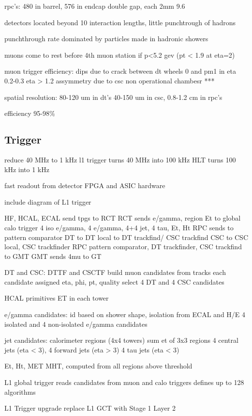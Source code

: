 \documentclass[oneside, letterpaper, oldfontcommands]{memoir}
\begin{document}
rpc's: 480 in barrel, 576 in endcap
double gap, each 2mm 9.6

detectors located beyond 10 interaction lengths, little punchtrough of hadrons

punchthrough rate dominated by particles made in hadronic showers

muons come to rest before 4th muon station if p<5.2 gev (pt < 1.9 at eta=2)

muon trigger efficiency: dips due to crack between dt wheels 0 and pm1 in eta 0.2-0.3
eta > 1.2 assymmetry due to csc non operational chambesr ***

spatial resolution: 80-120 um in dt's 40-150 um in csc, 0.8-1.2 cm in rpc's

efficiency 95-98\%
\subsection{Trigger}\label{trigger}

reduce 40 MHz to 1 kHz
l1 trigger turns 40 MHz into 100 kHz
HLT turns 100 kHz into 1 kHz

fast readout from detector
FPGA and ASIC hardware 

include diagram of L1 trigger

HF, HCAL, ECAL send tpgs to RCT
RCT sends e/gamma, region Et to global calo trigger
4 iso e/gamma, 4 e/gamma, 4+4 jet, 4 tau, Et, Ht
RPC sends to pattern comparator
DT to DT local to DT trackfind/ CSC trackfind
CSC to CSC local, CSC trackfinder
RPC pattern comparator, DT trackfinder, CSC trackfind to GMT
GMT sends 4mu to GT


DT and CSC: DTTF and CSCTF build muon candidates from tracks
	each candidate assigned eta, phi, pt, quality
	select 4 DT and 4 CSC candidates

HCAL primitives
	ET in each tower
	
e/gamma candidates: id based on shower shape, isolation from ECAL and H/E
	4 isolated and 4 non-isolated e/gamma candidates
	
jet candidates:
	calorimeter regions (4x4 towers)
	sum et of 3x3 regions
	4 central jets (eta < 3), 4 forward jets (eta > 3)
	4 tau jets (eta < 3)
	
Et, Ht, MET MHT, computed from all regions above threshold

L1 global trigger reads candidates from muon and calo triggers
defines up to 128 algorithms

L1 Trigger upgrade
replace L1 GCT with Stage 1 Layer 2
\end{document}
